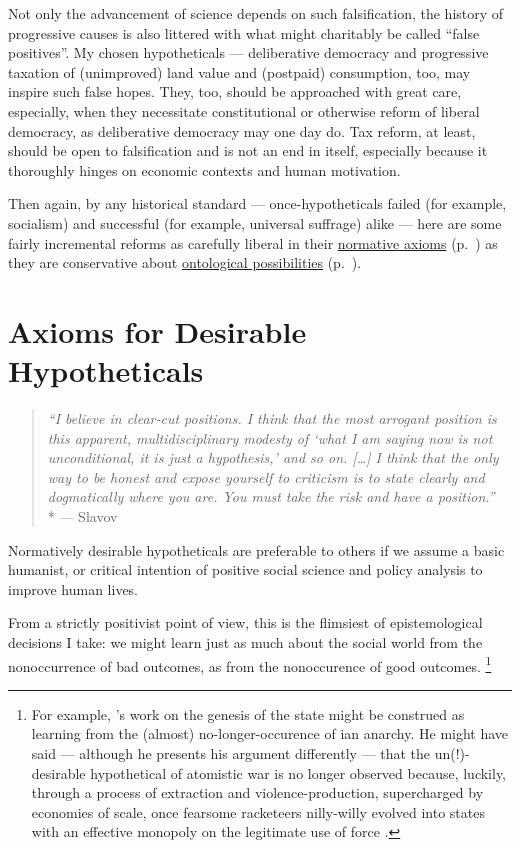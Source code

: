 Not only the advancement of science depends on such falsification, the history of progressive causes is also littered with what might charitably be called ``false positives''.
My chosen hypotheticals --- deliberative democracy and progressive taxation of (unimproved) land value and (postpaid) consumption, too, may inspire such false hopes.
They, too, should be approached with great care, especially, when they necessitate constitutional or otherwise reform of liberal democracy, as deliberative democracy may one day do.
Tax reform, at least, should be open to falsification and is not an end in itself, especially because it thoroughly hinges on economic contexts and human motivation.

Then again, by any historical standard --- once-hypotheticals failed (for example, socialism) and successful (for example, universal suffrage) alike --- here are some fairly incremental reforms as carefully liberal in their \hyperref[sec:axiology]{normative axioms} (p.~\pageref{sec:axiology}) as they are conservative about \hyperref[sec:ontology]{ontological possibilities} (p.~\pageref{sec:ontology}).

\section[Axiology]{Axioms for Desirable Hypotheticals}
	\label{sec:axiology}

\begin{quote}
	\emph{``I believe in clear-cut positions.
	I think that the most arrogant position is this apparent, multidisciplinary modesty of \emph{`what I am saying now is not unconditional, it is just a hypothesis,'} and so on.
	[\ldots]
	I think that the only way to be honest and expose yourself to criticism is to state clearly and dogmatically where you are.
	You must take the risk and have a position.''}
	\\*
	--- Slavov \citet[45]{Zizek2003}
\end{quote}

Normatively desirable hypotheticals are preferable to others if we assume a basic humanist, or critical intention of positive social science and policy analysis to improve human lives.

From a strictly positivist point of view, this is the flimsiest of epistemological decisions I take:
we might learn just as much about the social world from the nonoccurrence of bad outcomes, as from the nonoccurence of good outcomes.
\footnote{
	For example, \citeauthor{Tilly-1985-aa}'s work on the genesis of the state might be construed as learning from the (almost) no-longer-occurence of \citeauthor{Hobbes-1651-aa}ian anarchy.
	He might have said --- although he presents his argument differently --- that the un(!)-desirable hypothetical of atomistic war is no longer observed because, luckily, through a process of extraction and violence-production, supercharged by economies of scale, once fearsome racketeers nilly-willy evolved into states with an effective monopoly on the legitimate use of force \citep{Tilly-1985-aa}.
}

